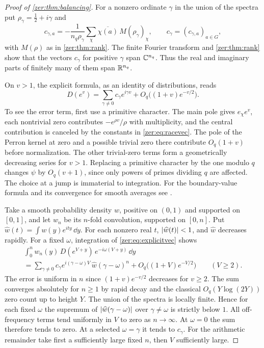 \begin{proof}[Proof of \cref{zer:thm:balancing}]
For a nonzero ordinate $\gamma$ in the union of the spectra put
$\rho_\gamma=\tfrac12+i\gamma$ and
\[
 c_{\gamma,a}=-\frac1{n_q\rho_\gamma}\sum_\chi\overline{\chi(a)}\,M(\rho_\gamma)_\chi,
 \qquad c_\gamma=(c_{\gamma,a})_{a\in G},
\]
with $M(\rho)$ as in \cref{zer:thm:rank}. The finite Fourier transform and
\cref{zer:thm:rank} show that the vectors $c_\gamma$ for positive $\gamma$ span
$\mathbb{C}^{n_q}$. Thus the real and imaginary parts of finitely many of them span $\mathbb{R}^{n_q}$.

On $v>1$, the explicit formula, as an identity of distributions, reads
\begin{equation}\label{zer:eq:explicitvec}
 D(e^v)=\sum_{\gamma\ne0}c_\gamma e^{i\gamma v}+O_q\bigl((1+v)e^{-v/2}\bigr).
\end{equation}
To see the error term, first use a primitive character. The main pole gives $e_\chi e^v$,
each nontrivial zero contributes $-e^{\rho v}/\rho$ with multiplicity, and the central
contribution is canceled by the constants in \eqref{zer:eq:racevec}. The pole of the
Perron kernel at zero and a possible trivial zero there contribute $O_q(1+v)$ before
normalization. The other trivial-zero terms form a geometrically decreasing series for
$v>1$. Replacing a primitive character by the one modulo $q$ changes $\psi$ by
$O_q(v+1)$, since only powers of primes dividing $q$ are affected. The choice at a jump is
immaterial to integration. For the boundary-value formula and its convergence for smooth
averages see \cite[Theorem~1(d),(e)]{KaczorowskiRamare2003Almost}.

Take a smooth probability density $w$, positive on $(0,1)$ and supported on $[0,1]$, and
let $w_n$ be its $n$-fold convolution, supported on $[0,n]$. Put
$\widehat w(t)=\int w(y)e^{ity}\,\dd y$. For each nonzero real $t$,
$\lvert\widehat w(t)\rvert<1$, and $\widehat w$ decreases rapidly. For a fixed $\omega$,
integration of \eqref{zer:eq:explicitvec} shows
\begin{multline*}
 \int_0^nw_n(y)\,D(e^{V+y})\,e^{-i\omega(V+y)}\,\dd y\\
 =\sum_{\gamma\ne0}c_\gamma e^{i(\gamma-\omega)V}\,\widehat w(\gamma-\omega)^n
 +O_q\bigl((1+V)e^{-V/2}\bigr)\qquad(V\ge2).
\end{multline*}
The error is uniform in $n$ since $(1+v)e^{-v/2}$ decreases for $v\ge2$. The sum converges
absolutely for $n\ge1$ by rapid decay and the classical $O_q(Y\log(2Y))$ zero count up to
height $Y$. The union of the spectra is locally finite. Hence for each fixed $\omega$ the
supremum of $\lvert\widehat w(\gamma-\omega)\rvert$ over $\gamma\ne\omega$ is strictly below $1$.
All off-frequency terms tend uniformly in $V$ to zero as $n\to\infty$. At $\omega=0$ the
sum therefore tends to zero. At a selected $\omega=\gamma$ it tends to $c_\gamma$. For the
arithmetic remainder take first a sufficiently large fixed $n$, then $V$ sufficiently
large.


\end{proof}
